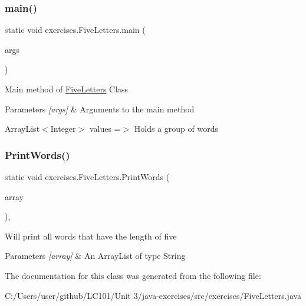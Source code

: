 \subsubsection{\texorpdfstring{main()}{main()}}
{\footnotesize\ttfamily static void exercises.\+Five\+Letters.\+main (\begin{DoxyParamCaption}\item[{String \mbox{[}$\,$\mbox{]}}]{args }\end{DoxyParamCaption})\hspace{0.3cm}{\ttfamily [static]}}

Main method of \mbox{\hyperlink{classexercises_1_1_five_letters}{Five\+Letters}} Class 
\begin{DoxyParams}{Parameters}
{\em \mbox{[}args\mbox{]}} & Arguments to the main method \\
\hline
\end{DoxyParams}
Array\+List$<$\+Integer$>$ values =$>$ Holds a group of words \mbox{\label{classexercises_1_1_five_letters_a348b407c7defcb69c0d97d0e2467ca4d}} 
\subsubsection{\texorpdfstring{PrintWords()}{PrintWords()}}
{\footnotesize\ttfamily static void exercises.\+Five\+Letters.\+Print\+Words (\begin{DoxyParamCaption}\item[{Array\+List$<$ String $>$}]{array }\end{DoxyParamCaption})\hspace{0.3cm}{\ttfamily [static]}, {\ttfamily [private]}}

Will print all words that have the length of five 
\begin{DoxyParams}{Parameters}
{\em \mbox{[}array\mbox{]}} & An Array\+List of type String \\
\hline
\end{DoxyParams}


The documentation for this class was generated from the following file\+:\begin{DoxyCompactItemize}
\item 
C\+:/\+Users/user/github/\+L\+C101/\+Unit 3/java-\/exercises/src/exercises/Five\+Letters.\+java\end{DoxyCompactItemize}
